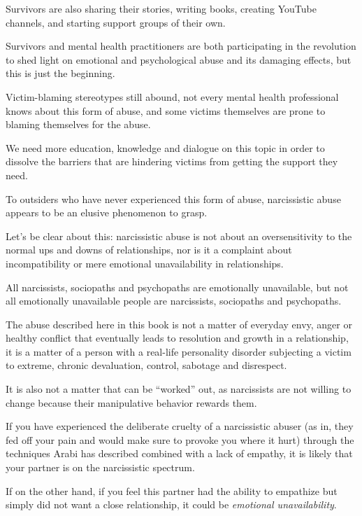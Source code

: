 \documentclass[oneside]{book}
\numberwithin{equation}{section}
\begin{document}
%
Survivors are also sharing their stories, writing books, creating YouTube channels, and starting support groups of their own.

Survivors and mental health practitioners are both participating in the revolution to shed light on emotional and psychological abuse and its damaging effects, but this is just the beginning.

Victim-blaming stereotypes still abound, not every mental health professional knows about this form of abuse, and some victims themselves are prone to blaming themselves for the abuse.

We need more education, knowledge and dialogue on this topic in order to dissolve the barriers that are hindering victims from getting the support they need.

To outsiders who have never experienced this form of abuse, narcissistic abuse appears to be an elusive phenomenon to grasp.

Let's be clear about this: narcissistic abuse is not about an oversensitivity to the normal ups and downs of relationships, nor is it a complaint about incompatibility or mere emotional unavailability in relationships.

All narcissists, sociopaths and psychopaths are emotionally unavailable, but not all emotionally unavailable people are narcissists, sociopaths and psychopaths.


%
The abuse described here in this book is not a matter of everyday envy, anger or healthy conflict that eventually leads to resolution and growth in a relationship, it is a matter of a person with a real-life personality disorder subjecting a victim to extreme, chronic devaluation, control, sabotage and disrespect.

It is also not a matter that can be ``worked'' out, as narcissists are not willing to change because their manipulative behavior rewards them.

%
If you have experienced the deliberate cruelty of a narcissistic abuser (as in, they fed off your pain and would make sure to provoke you where it hurt) through the techniques Arabi has described combined with a lack of empathy, it is likely that your partner is on the narcissistic spectrum.

If on the other hand, if you feel this partner had the ability to empathize but simply did not want a close relationship, it could be \textit{emotional unavailability}.
\end{document}
